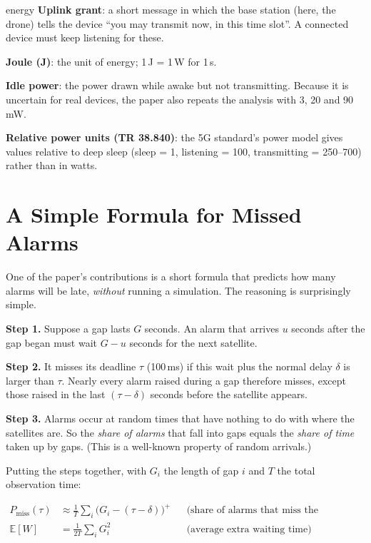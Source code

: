 \documentclass[11pt,a4paper]{article}
\newcommand{\kt}[1]{\textbf{\color{navy}#1}}
\begin{document}
\begin{term}{energy}
\kt{Uplink grant}: a short message in which the base station (here, the drone) tells the device ``you may transmit now, in this time slot''. A connected device must keep listening for these.\par
\kt{Joule (J)}: the unit of energy; 1\,J = 1\,W for 1\,s.\par
\kt{Idle power}: the power drawn while awake but not transmitting. Because it is uncertain for real devices, the paper also repeats the analysis with 3, 20 and 90\,mW.\par
\kt{Relative power units (TR 38.840)}: the 5G standard's power model gives values relative to deep sleep (sleep = 1, listening = 100, transmitting = 250--700) rather than in watts.
\end{term}

\section{A Simple Formula for Missed Alarms}\label{sec:model}

One of the paper's contributions is a short formula that predicts how many alarms will be late, \emph{without} running a simulation. The reasoning is surprisingly simple.

\textbf{Step 1.} Suppose a gap lasts $G$ seconds. An alarm that arrives $u$ seconds after the gap began must wait $G-u$ seconds for the next satellite.

\textbf{Step 2.} It misses its deadline $\tau$ (100\,ms) if this wait plus the normal delay $\delta$ is larger than $\tau$. Nearly every alarm raised during a gap therefore misses, except those raised in the last $(\tau-\delta)$ seconds before the satellite appears.

\textbf{Step 3.} Alarms occur at random times that have nothing to do with where the satellites are. So the \emph{share of alarms} that fall into gaps equals the \emph{share of time} taken up by gaps. (This is a well-known property of random arrivals.)

Putting the steps together, with $G_i$ the length of gap $i$ and $T$ the total observation time:

\begin{tcolorbox}[colback=white,colframe=navy,arc=2pt,boxrule=0.8pt]
\begin{align*}
P_\text{miss}(\tau) &\approx \frac{1}{T}\sum_i \bigl(G_i-(\tau-\delta)\bigr)^{+}
&&\text{(share of alarms that miss the deadline)}\\[4pt]
\mathbb{E}[W] &= \frac{1}{2T}\sum_i G_i^{2}
&&\text{(average extra waiting time)}
\end{align*}
\end{tcolorbox}
\end{document}
